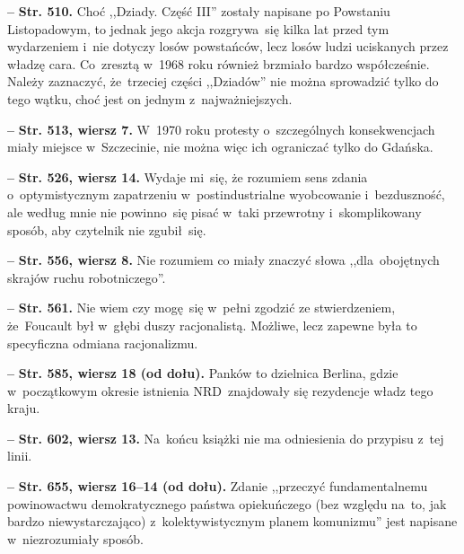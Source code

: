 \documentclass[a4paper,11pt]{article}
\newcommand{\spaceFour}{0.5em}
\newcommand{\tb}{\textbf}
\newcommand{\noi}{\noindent}
\newcommand{\start}{\noi \tb{--} {}}
\newcommand{\Str}[1]{\tb{Str. #1.}}
\newcommand{\StrWg}[2]{\tb{Str. #1, wiersz #2.}}
\newcommand{\StrWd}[2]{\tb{Str. #1, wiersz #2 (od dołu).}}
\begin{document}
\vspace{\spaceFour}


\start \Str{510} Choć ,,Dziady. Część III'' zostały napisane po
Powstaniu Listopadowym, to jednak jego akcja rozgrywa~się kilka lat
przed tym wydarzeniem i~nie dotyczy losów powstańców, lecz losów ludzi
uciskanych przez władzę cara. Co~zresztą w~1968 roku również brzmiało
bardzo współcześnie. Należy zaznaczyć, że~trzeciej części ,,Dziadów''
nie można sprowadzić tylko do tego wątku, choć jest on jednym
z~najważniejszych.

\vspace{\spaceFour}


\start \StrWg{513}{7} W~1970 roku protesty o~szczególnych
konsekwencjach miały miejsce w~Szczecinie, nie można więc ich
ograniczać tylko do Gdańska.

\vspace{\spaceFour}


\start \StrWg{526}{14} Wydaje mi~się, że rozumiem sens zdania
o~optymistycznym zapatrzeniu w~postindustrialne wyobcowanie
i~bezduszność, ale według mnie nie powinno~się pisać w~taki przewrotny
i~skomplikowany sposób, aby czytelnik nie zgubił~się.

\vspace{\spaceFour}


\start \StrWg{556}{8} Nie rozumiem co miały znaczyć słowa
,,dla~obojętnych skrajów ruchu robotniczego''.

\vspace{\spaceFour}


\start \Str{561} Nie wiem czy mogę~się w~pełni zgodzić ze
stwierdzeniem, że~Foucault był w~głębi duszy racjonalistą. Możliwe,
lecz zapewne była to specyficzna odmiana racjonalizmu.

\vspace{\spaceFour}


\start \StrWd{585}{18} Panków to dzielnica Berlina, gdzie
w~początkowym okresie istnienia NRD~znajdowały się rezydencje władz
tego kraju.

\vspace{\spaceFour}


\start \StrWg{602}{13} Na~końcu książki nie ma odniesienia do przypisu
z~tej linii.

\vspace{\spaceFour}


\start \StrWd{655}{16--14} Zdanie ,,przeczyć fundamentalnemu
powinowactwu demokratycznego państwa opiekuńczego (bez względu na~to,
jak bardzo niewystarczająco) z~kolektywistycznym planem komunizmu''
jest napisane w~niezrozumiały sposób.
\end{document}

